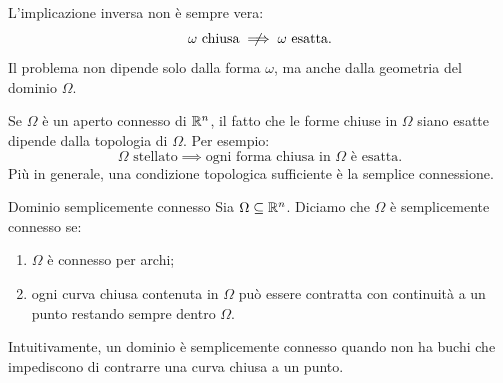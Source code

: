 \documentclass[a4paper]{article}
\begin{document}
L'implicazione inversa non è sempre vera:
\[
    \omega \text{ chiusa}
    \centernot\implies
    \omega \text{ esatta}.
\]
Il problema non dipende solo dalla forma \(\omega\), ma anche dalla geometria del dominio \(\Omega\).

Se \(\Omega\) è un aperto connesso di \(\mathbb{R}^n\), il fatto che le forme chiuse in \(\Omega\) siano esatte dipende dalla topologia di \(\Omega\). Per esempio:
\[
    \Omega \text{ stellato}
    \implies
    \text{ogni forma chiusa in } \Omega \text{ è esatta}.
\]
Più in generale, una condizione topologica sufficiente è la semplice connessione.

\begin{snippetdefinition}{Dominio semplicemente connesso}
    Sia \(\Omega\subseteq\mathbb{R}^n\). Diciamo che \(\Omega\) è semplicemente connesso se:
    \begin{enumerate}
        \item \(\Omega\) è connesso per archi;
        \item ogni curva chiusa contenuta in \(\Omega\) può essere contratta con continuità a un punto restando sempre dentro \(\Omega\).
    \end{enumerate}
\end{snippetdefinition}

Intuitivamente, un dominio è semplicemente connesso quando non ha buchi che impediscono di contrarre una curva chiusa a un punto.

\begin{center}
\end{center}
\end{document}
